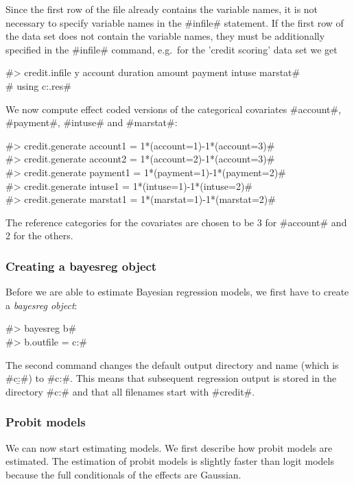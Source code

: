 Since the first row of the file already contains the variable names,
it is not necessary to specify variable names in the #infile#
statement. If the first row of the data set does not contain the
variable names, they must be additionally specified in the #infile#
command, e.g.~for the 'credit scoring' data set we get

#> credit.infile y account duration amount payment intuse marstat# \\
#  using c:\bayes\examples\credit.res#


We now compute effect coded versions of the categorical covariates
#account#, #payment#, #intuse# and #marstat#:

#> credit.generate account1  = 1*(account=1)-1*(account=3)# \\
#> credit.generate account2  = 1*(account=2)-1*(account=3)# \\
#> credit.generate payment1 = 1*(payment=1)-1*(payment=2)# \\
#> credit.generate intuse1 = 1*(intuse=1)-1*(intuse=2)# \\
#> credit.generate marstat1 = 1*(marstat=1)-1*(marstat=2)#

The reference categories for the covariates are chosen to be 3 for
#account# and 2 for the others.

\subsubsection{Creating a bayesreg object}

Before we are able to estimate Bayesian regression models, we first
have to create a {\em bayesreg object}:

#> bayesreg b# \\
#> b.outfile = c:\results\credit#

The second command changes the default output directory and name
(which is #c:\bayes\output\b#) to #c:\results\credit#. This means
that subsequent regression output is stored in the directory
#c:\results# and that all filenames start with #credit#.

\subsubsection{Probit models}

\label{credit_probit} We can now start estimating models. We first
describe how probit models are estimated. The estimation of probit
models is slightly faster than logit models because the full
conditionals of the effects are Gaussian.

